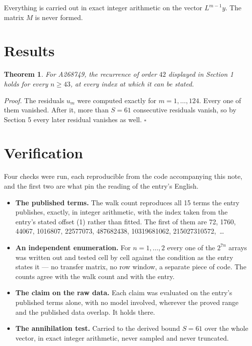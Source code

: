 \documentclass[11pt]{article}
\newtheorem{theorem}{Theorem}
\theoremstyle{definition}
\begin{document}
Everything is carried out in exact integer arithmetic on the vector $L^{m-1}y$. The matrix $M$ is never formed.

\section{Results}

\begin{theorem} For A268749, the recurrence of order $42$ displayed in Section 1 holds for every $n \ge 43$, at every index at which it can be stated.\end{theorem}

{\itshape Proof.} The residuals $u_m$ were computed exactly for $m = 1,\dots,124$. Every one of them vanished. After it, more than $S = 61$ consecutive residuals vanish, so by Section 5 every later residual vanishes as well. $\square$

\section{Verification}

Four checks were run, each reproducible from the code accompanying this note, and the first two are what pin the reading of the entry's English.

\begin{itemize}

\item {\bfseries The published terms.} The walk count reproduces all 15 terms the entry publishes, exactly, in integer arithmetic, with the index taken from the entry's stated offset (1) rather than fitted. The first of them are 72, 1760, 44067, 1016807, 22577073, 487682438, 10319681062, 215027310572,~\dots

\item {\bfseries An independent enumeration.} For $n = 1,\dots,2$ every one of the $2^{7n}$ arrays was written out and tested cell by cell against the condition as the entry states it --- no transfer matrix, no row window, a separate piece of code. The counts agree with the walk count and with the entry.

\item {\bfseries The claim on the raw data.} Each claim was evaluated on the entry's published terms alone, with no model involved, wherever the proved range and the published data overlap. It holds there.

\item {\bfseries The annihilation test.} Carried to the derived bound $S = 61$ over the whole vector, in exact integer arithmetic, never sampled and never truncated.

\end{itemize}
\end{document}
